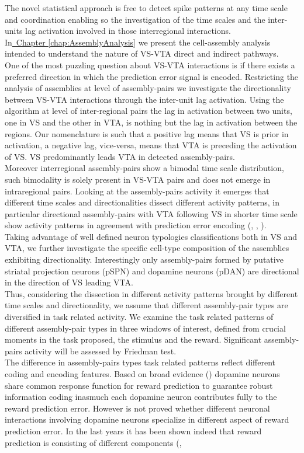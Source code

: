 The novel statistical approach is free to detect spike patterns at any time scale and coordination enabling so the investigation of the time scales and the inter-units lag activation involved in those interregional interactions.\\In\hyperref[chap:AssemblyAnalysis]{~Chapter \ref*{chap:AssemblyAnalysis}} we present the cell-assembly analysis intended to understand the nature of VS-VTA direct and indirect pathways.\\One of the most puzzling question about VS-VTA interactions is if there exists a preferred direction in which the prediction error signal is encoded. Restricting the analysis of assemblies at level of assembly-pairs we investigate the directionality between VS-VTA interactions through the inter-unit lag activation. Using the algorithm at level of inter-regional pairs the lag in activation between two units, one in VS and the other in VTA, is nothing but the lag in activation between the regions. Our nomenclature is such that a positive lag means that VS is prior in activation, a negative lag, vice-versa, means that VTA is preceding the activation of VS. VS predominantly leads VTA in detected assembly-pairs.\\Moreover interregional assembly-pairs show a bimodal time scale distribution, such bimodality is solely present in VS-VTA pairs and does not emerge in intraregional pairs. Looking at the assembly-pairs activity it emerges that different time scales and directionalities dissect different activity patterns, in particular directional assembly-pairs with VTA following VS in shorter time scale show activity patterns in agreement with prediction error encoding (\cite{Tobler2003}, \cite{Nomoto2010}, \cite{Schultz2016}).\\Taking advantage of well defined neuron typologies classifications both in VS and VTA, we further investigate the specific cell-type composition of the assemblies exhibiting directionality. Interestingly only assembly-pairs formed by putative striatal projection neurons (pSPN) and dopamine neurons (pDAN) are directional in the direction of VS leading VTA.\\Thus, considering the dissection in different activity patterns brought by different time scales and directionality, we assume that different assembly-pair types are diversified in task related activity. We examine the task related patterns of different assembly-pair types in three windows of interest, defined from crucial moments in the task proposed, the stimulus and the reward. Significant assembly-pairs activity will be assessed by Friedman test.\\The difference in assembly-pairs types task related patterns reflect different coding and encoding features. Based on broad evidence (\cite{Eshel}) dopamine neurons share common response function for reward prediction to guarantee robust information coding inasmuch each dopamine neuron contributes fully to the reward prediction error. However is not proved whether different neuronal interactions involving dopamine neurons specialize in different aspect of reward prediction error. In the last years it has been shown indeed that reward prediction is consisting of different components (\cite{Nomoto2010}, 